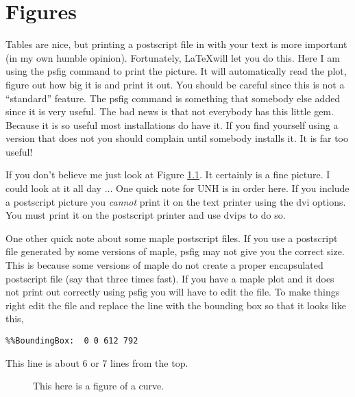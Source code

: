 \chapter{Figures}

Tables are nice, but printing a postscript file in with your text is
more important (in my own humble opinion).  Fortunately, \LaTeX will
let you do this.  Here I am using the psfig command to print the
picture.  It will automatically read the plot, figure out how big it
is and print it out.  You should be careful since this is not a
``standard'' feature.  The psfig command is something that somebody
else added since it is very useful.  The bad news is that not
everybody has this little gem.  Because it is so useful most
installations do have it.  If you find yourself using a version that
does not you should complain until somebody installs it.  It is far
too useful!


If you don't believe me just look at Figure \ref{twodtest}.  It
certainly is a fine picture.  I could look at it all day $\ldots$ One
quick note for UNH is in order here.  If you include a postscript
picture you {\em cannot} print it on the text printer using the dvi
options.  You must print it on the postscript printer and use dvips to
do so.

One other quick note about some maple postscript files.  If you use a
postscript file generated by some versions of maple, psfig may not
give you the correct size.  This is because some versions of maple do
not create a proper encapsulated postscript file (say that three times
fast).  If you have a maple plot and it does not print out correctly
using psfig you will have to edit the file.  To make things right edit
the file and replace the line with the bounding box so that it looks
like this,
\begin{verbatim}
%%BoundingBox:  0 0 612 792
\end{verbatim}
This line is about 6 or 7 lines from the top.


\begin{figure}[htbp]
\centerline{}
\caption{This here is a figure of a curve.}
\label{twodtest}
\end{figure}

